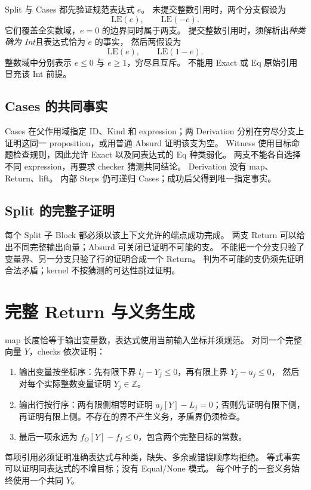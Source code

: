 Split 与 Cases 都先验证规范表达式 $e$。
未提交整数引用时，两个分支假设为
\[
 \mathrm{LE}(e),\qquad\mathrm{LE}(-e).
\]
它们覆盖全实数域，$e=0$ 的边界同时属于两支。
提交整数引用时，须解析出\emph{种类确为 Int}且表达式恰为 $e$ 的事实，
然后两假设为
\[
 \mathrm{LE}(e),\qquad\mathrm{LE}(1-e).
\]
整数域中分别表示 $e\le0$ 与 $e\ge1$，穷尽且互斥。
不能用 Exact 或 Eq 原始引用冒充该 Int 前提。

\subsection{Cases 的共同事实}

Cases 在父作用域指定 ID、Kind 和 expression；两 Derivation
分别在穷尽分支上证明这同一 proposition，或用普通 Absurd 证明该支为空。
Witness 使用目标命题检查规则，因此允许 Exact 以及同表达式的 Eq 种类弱化。
两支不能各自选择不同 expression，再要求 checker 猜测共同结论。
Derivation 没有 map、Return、lift。
内部 Steps 仍可递归 Cases；成功后父得到唯一指定事实。

\subsection{Split 的完整子证明}

每个 Split 子 Block 都必须以该上下文允许的端点成功完成。
两支 Return 可以给出不同完整输出向量；Absurd 可关闭已证明不可能的支。
不能把一个分支只验了变量界、另一分支只验了行的证明合成一个 Return。
判为不可能的支仍须先证明合法矛盾；kernel 不按猜测的可达性跳过证明。


\section{完整 Return 与义务生成}
\label{sec:mapping-state}
\label{sec:obligation-generation}
map 长度恰等于输出变量数，表达式使用当前输入坐标并须规范。
对同一个完整向量 $Y$，checks 依次证明：
\begin{enumerate}
\item 输出变量按坐标序：先有限下界 $l_j-Y_j\le0$，再有限上界 $Y_j-u_j\le0$，
然后对每个实际整数变量证明 $Y_j\in\mathbb Z$。
\item 输出行按行序：两有限侧相等时证明 $a_j[Y]-L_j=0$；否则先证明有限下侧，
再证明有限上侧。不存在的界不产生义务，矛盾界仍须检查。
\item 最后一项永远为 $f_O[Y]-f_I\le0$，包含两个完整目标的常数。
\end{enumerate}
每项引用必须证明准确表达式与种类，缺失、多余或错误顺序均拒绝。
等式事实可以证明同表达式的不增目标；没有 Equal/None 模式。
每个叶子的一套义务始终使用一个共同 $Y$。

